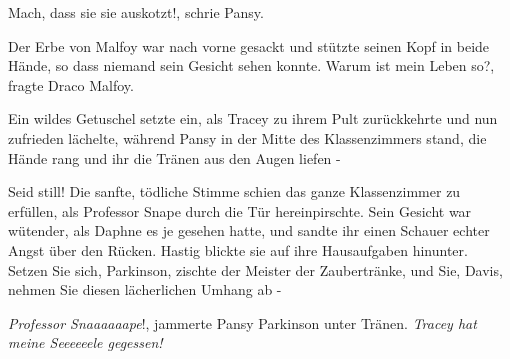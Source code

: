 \glqq{}Mach, dass sie sie auskotzt!\grqq{}, schrie Pansy.

Der Erbe von Malfoy war nach vorne gesackt und stützte seinen Kopf in beide
Hände, so dass niemand sein Gesicht sehen konnte. \glqq{}Warum ist mein Leben
so?\grqq{}, fragte Draco Malfoy.

Ein wildes Getuschel setzte ein, als Tracey zu ihrem Pult zurückkehrte und nun
zufrieden lächelte, während Pansy in der Mitte des Klassenzimmers stand, die
Hände rang und ihr die Tränen aus den Augen liefen -

\glqq{}Seid still!\grqq{} Die sanfte, tödliche Stimme schien das ganze
Klassenzimmer zu erfüllen, als Professor Snape durch die Tür hereinpirschte.
Sein Gesicht war wütender, als Daphne es je gesehen hatte, und sandte ihr einen
Schauer echter Angst über den Rücken. Hastig blickte sie auf ihre Hausaufgaben
hinunter. \glqq{}Setzen Sie sich, Parkinson\grqq{}, zischte der Meister der
Zaubertränke, \glqq{}und Sie, Davis, nehmen Sie diesen lächerlichen Umhang ab
-\grqq{}

\glqq{}\emph{Professor Snaaaaaape}!\grqq{}, jammerte Pansy Parkinson unter
Tränen. \glqq{}\emph{Tracey hat} \emph{meine Seeeeeele gegessen!}\grqq{}

